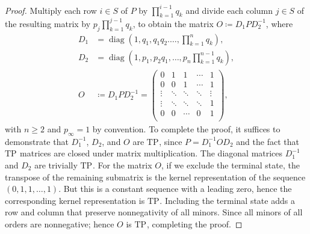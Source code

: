 \documentclass[10pt,a4paper]{amsart}
\newcommand{\TP}[1]{\textrm{TP}_{#1}}
\DeclareMathOperator{\diag}{diag}
\begin{document}
	\begin{proof}
		Multiply each row $i\in S$ of  $P$ by $\prod_{k=1}^{i-1}q_{k}$ and divide  each column   $j \in S$ of the resulting matrix by $ p_j\prod_{k = 1}^{j-1} q_k $, to obtain the matrix $O \coloneqq D_1PD_2^{-1}$, where
		\begin{equation}\label{def.ABC}
			\begin{aligned}
				D_1 &= \diag(1, q_1, q_1q_2. \ldots, \prod_{k=1}^{n}q_{k}),\\
				D_2 &= \diag(1, p_1,  p_2q_1, \ldots,  p_{n}\prod_{k=1}^{n-1}q_{k}),\\[5pt]
				O&\coloneqq D_1PD_2^{-1} = \left(\begin{array}{cccccc}
					0 & 1 & 1 & \cdots& 1\\
					0 & 0 & 1 &   \cdots & 1\\
					\vdots & \ddots  &\ddots &\ddots & \vdots\\
					\vdots & \ddots  &\ddots &\ddots & 1\\		
					0 & 0 & \cdots  &0 &1 \\				
				\end{array}\right),
		\end{aligned}
	\end{equation}
	with $n \ge 2$ and $p_\infty = 1$ by convention. To complete the proof, it suffices to demonstrate that \( D_1^{-1} \), \( D_2 \), and \( O \) are \( \TP{} \), since \( P = D_1^{-1} O D_2 \) and the fact that \( \TP{} \) matrices are closed under matrix multiplication. The diagonal matrices \( D_1^{-1} \) and \( D_2 \) are trivially \( \TP{} \). For the matrix $O$, if we exclude the terminal state, the transpose of the remaining submatrix is the kernel representation of the sequence \( (0,1,1,\dots,1)\).  But this  is a constant sequence with a leading zero, hence the corresponding  kernel representation is  \( \TP{} \). Including the terminal state adds a row and column that preserve nonnegativity of all minors. Since all minors of all orders are nonnegative; hence   \( O \) is \( \TP{} \), completing the proof.

\end{proof}
\end{document}
